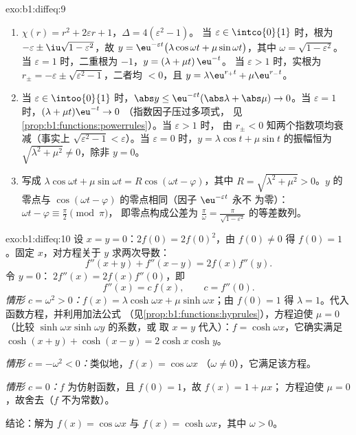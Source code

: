 \begin{solution}{exo:b1:diffeq:9}
\begin{enumerate}
  \item $\chi(r) = r^2 + 2\varepsilon r + 1$，$\Delta = 4(\varepsilon^2
        - 1)$。
        当 $\varepsilon \in \intco{0}{1}$ 时，根为 $-\varepsilon \pm
        \iu\sqrt{1 - \varepsilon^2}$，故
        $y = \eu^{-\varepsilon t}\bigl(\lambda\cos\omega t +
        \mu\sin\omega t\bigr)$，其中 $\omega = \sqrt{1 -
        \varepsilon^2}$。
        当 $\varepsilon = 1$ 时，二重根为 $-1$，$y = (\lambda + \mu
        t)\,\eu^{-t}$。
        当 $\varepsilon > 1$ 时，实根为 $r_\pm = -\varepsilon \pm
        \sqrt{\varepsilon^2 - 1}$，二者均 $< 0$，且 $y =
        \lambda\eu^{r_+t} + \mu\eu^{r_-t}$。
  \item 当 $\varepsilon \in \intoo{0}{1}$ 时，$\abs y \leq
        \eu^{-\varepsilon t}(\abs\lambda + \abs\mu) \to 0$。当
        $\varepsilon = 1$ 时，$(\lambda + \mu t)\eu^{-t} \to 0$
        （指数因子压过多项式，
        见\cref{prop:b1:functions:powerrules}）。当 $\varepsilon > 1$ 时，
        由 $r_\pm < 0$ 知两个指数项均衰减（事实上
        $\sqrt{\varepsilon^2 - 1} < \varepsilon$）。当 $\varepsilon =
        0$ 时，$y = \lambda\cos t + \mu\sin t$ 的振幅恒为
        $\sqrt{\lambda^2 + \mu^2} \neq 0$，除非 $y = 0$。
  \item 写成 $\lambda\cos\omega t + \mu\sin\omega t =
        R\cos(\omega t - \varphi)$，其中 $R = \sqrt{\lambda^2 + \mu^2}
        > 0$。$y$ 的零点与 $\cos(\omega t -
        \varphi)$ 的零点相同（因子 $\eu^{-\varepsilon t}$ 永不
        为零）：$\omega t - \varphi \equiv \frac\pi2 \pmod \pi$，
        即零点构成公差为 $\frac{\pi}{\omega} =
        \frac{\pi}{\sqrt{1 - \varepsilon^2}}$ 的等差数列。
\end{enumerate}
\end{solution}

\begin{solution}{exo:b1:diffeq:10}
设 $x = y = 0$：$2f(0) = 2f(0)^2$，由 $f(0) \neq 0$ 得 $f(0) =
1$。固定 $x$，对方程关于 $y$ 求两次导数：
\[
f''(x+y) + f''(x-y) = 2 f(x) f''(y) .
\]
令 $y = 0$：$\;2f''(x) = 2 f(x) f''(0)$，即
\[
f''(x) = c\,f(x), \qquad c = f''(0).
\]
\emph{情形 $c = \omega^2 > 0$：}$f(x) = \lambda\cosh\omega x +
\mu\sinh\omega x$；由 $f(0) = 1$ 得 $\lambda = 1$。代入
函数方程，并利用加法公式
（见\cref{prop:b1:functions:hyprules}），方程迫使 $\mu = 0$
（比较 $\sinh\omega x \sinh\omega y$ 的系数，或
取 $x = y$ 代入）：$f = \cosh\omega x$，它确实满足
$\cosh(x+y) + \cosh(x-y) = 2\cosh x\cosh y$。

\emph{情形 $c = -\omega^2 < 0$：}类似地，$f(x) = \cos\omega x$
（$\omega \neq 0$），它满足该方程。

\emph{情形 $c = 0$：}$f$ 为仿射函数，且 $f(0) = 1$，故 $f(x) = 1 + \mu x$；
方程迫使 $\mu = 0$，故舍去（$f$ 不为常数）。

结论：解为 $f(x) = \cos\omega x$ 与 $f(x) =
\cosh\omega x$，其中 $\omega > 0$。
\end{solution}

